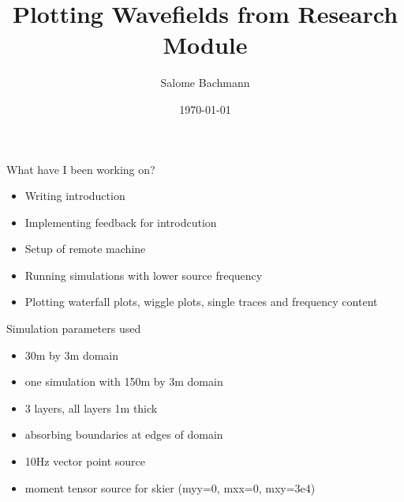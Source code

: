 \documentclass[11pt,aspectratio=169]{beamer}
\title{Plotting Wavefields from Research Module}
\date[]{\today}
\author{Salome Bachmann}
\institute{}
\begin{document}

\titleframe





\begin{frame}{What have I been working on?}
    \begin{itemize}
        \item Writing introduction
        \item Implementing feedback for introdcution
        \item Setup of remote machine
        \item Running simulations with lower source frequency
        \item Plotting waterfall plots, wiggle plots, single traces and frequency content 
    \end{itemize}
    
\end{frame}

\begin{frame}{Simulation parameters used}
    \begin{itemize}
        \item 30m by 3m domain
        \item one simulation with 150m by 3m domain
        \item 3 layers, all layers 1m thick
        \item absorbing boundaries at edges of domain
        \item 10Hz vector point source 
        \item moment tensor source for skier (myy=0, mxx=0, mxy=3e4)
    \end{itemize}
    
\end{frame}
\end{document}

